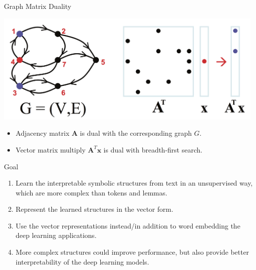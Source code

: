 %
\begin{frame}{Graph Matrix Duality}
	\vspace{-25pt}
	
  \begin{center}
  	\includegraphics[width=0.99\textwidth]{figures/graph2matrix}
  \end{center}
  
  \pause 

  \begin{itemize}
  	\item   Adjacency matrix $\mathbf{A}$ is dual with the corresponding graph $G$.
  	\pause 
  	\item Vector matrix multiply $\mathbf{A}^T\mathbf{x}$ is dual with breadth-first search.
  \end{itemize}
% 
%
\end{frame}


\begin{frame}{Goal}

  \begin{enumerate}
  	\item Learn the interpretable symbolic structures from text in an unsupervised way, which are \alert{more complex than tokens and lemmas}.
  	\pause 
  	\item Represent the learned structures in the vector form.
  	\pause 
  	\item Use the vector representations instead/in addition to word embedding the deep learning applications. 
  	\pause 
  	\item More complex structures could improve performance, but also provide better interpretability of the deep learning models. 
  	
  \end{enumerate}

\end{frame}

